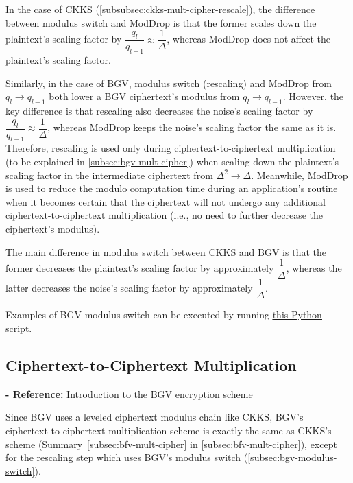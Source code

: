 In the case of CKKS (\autoref{subsubsec:ckks-mult-cipher-rescale}), the difference between modulus switch and \textsf{ModDrop} is that the former scales down the plaintext's scaling factor by $\dfrac{q_l}{q_{l-1}} \approx \dfrac{1}{\Delta}$, whereas \textsf{ModDrop} does not affect the plaintext's scaling factor. 

Similarly, in the case of BGV, modulus switch (rescaling) and \textsf{ModDrop} from $q_l \rightarrow q_{l-1}$ both lower a BGV ciphertext's modulus from $q_l \rightarrow q_{l-1}$. However, the key difference is that rescaling also decreases the noise's scaling factor by $\dfrac{q_l}{q_{l-1}} \approx \dfrac{1}{\Delta}$, whereas \textsf{ModDrop} keeps the noise's scaling factor the same as it is. Therefore, rescaling is used only during ciphertext-to-ciphertext multiplication (to be explained in \autoref{subsec:bgv-mult-cipher}) when scaling down the plaintext's scaling factor in the intermediate ciphertext from $\Delta^2 \rightarrow \Delta$. Meanwhile, \textsf{ModDrop} is used to reduce the modulo computation time during an application's routine when it becomes certain that the ciphertext will not undergo any additional ciphertext-to-ciphertext multiplication (i.e., no need to further decrease the ciphertext's modulus). 

The main difference in modulus switch between CKKS and BGV is that the former decreases the plaintext's scaling factor by approximately $\dfrac{1}{\Delta}$, whereas the latter decreases the noise's scaling factor by approximately $\dfrac{1}{\Delta}$. 

 Examples of BGV modulus switch can be executed by running \href{https://github.com/fhetextbook/fhe-textbook/blob/main/source%20code/bgv.py}{\underline{this Python script}}. 


\subsection{Ciphertext-to-Ciphertext Multiplication}
\label{subsec:bgv-mult-cipher}

\noindent \textbf{- Reference:} 
\href{https://www.inferati.com/blog/fhe-schemes-bgv}{Introduction to the BGV encryption scheme}

Since BGV uses a leveled ciphertext modulus chain like CKKS, BGV's ciphertext-to-ciphertext multiplication scheme is exactly the same as CKKS's scheme (Summary~\ref*{subsec:bfv-mult-cipher} in \autoref{subsec:bfv-mult-cipher}), except for the rescaling step which uses BGV's modulus switch (\autoref{subsec:bgv-modulus-switch}). 

